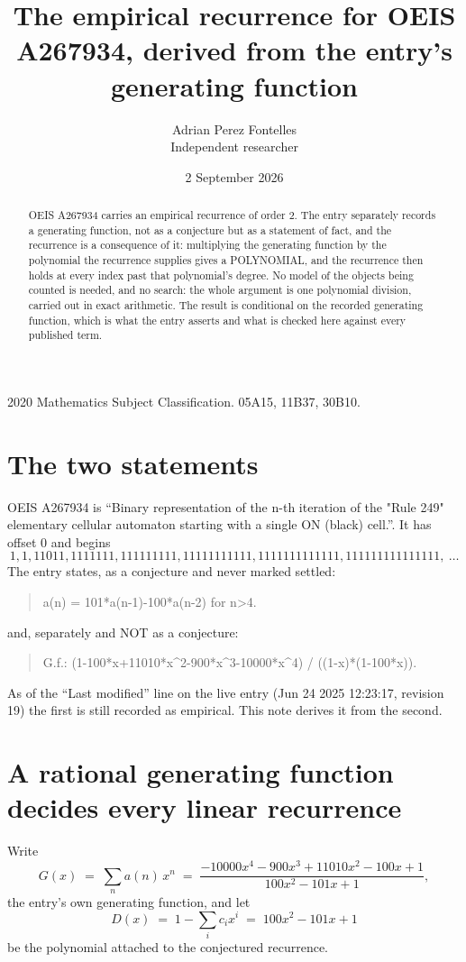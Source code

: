 \documentclass[11pt,a4paper]{article}
\title{The empirical recurrence for OEIS A267934, derived from the entry's generating function}
\author{Adrian Perez Fontelles\\ \small Independent researcher}
\date{2 September 2026}
\theoremstyle{plain}
\theoremstyle{definition}
\begin{document}
\maketitle

\begin{abstract}
OEIS A267934 carries an empirical recurrence of order $2$. The entry separately records a
generating function, not as a conjecture but as a statement of fact, and the recurrence is a
consequence of it: multiplying the generating function by the polynomial the recurrence
supplies gives a POLYNOMIAL, and the recurrence then holds at every index past that
polynomial's degree. No model of the objects being counted is needed, and no search: the
whole argument is one polynomial division, carried out in exact arithmetic. The result is
conditional on the recorded generating function, which is what the entry asserts and what is
checked here against every published term.
\end{abstract}

\noindent\small 2020 Mathematics Subject Classification. 05A15, 11B37, 30B10.\normalsize

\section{The two statements}

OEIS A267934 is ``Binary representation of the n-th iteration of the "Rule 249" elementary cellular automaton starting with a single ON (black) cell.''. It has offset $0$ and begins
\[
1, 1, 11011, 1111111, 111111111, 11111111111, 1111111111111, 111111111111111,\ \dots
\]
The entry states, as a conjecture and never marked settled:
\begin{quote}
a(n) = 101*a(n-1)-100*a(n-2) for n>4.
\end{quote}
and, separately and NOT as a conjecture:
\begin{quote}
G.f.: (1-100*x+11010*x\^{}2-900*x\^{}3-10000*x\^{}4) / ((1-x)*(1-100*x)).
\end{quote}
As of the ``Last modified'' line on the live entry (Jun 24 2025 12:23:17, revision 19) the first is still
recorded as empirical. This note derives it from the second.

\section{A rational generating function decides every linear recurrence}

Write
\[
G(x)\;=\;\sum_{n}a(n)\,x^{n}\;=\;\frac{- 10000 x^{4} - 900 x^{3} + 11010 x^{2} - 100 x + 1}{100 x^{2} - 101 x + 1},
\]
the entry's own generating function, and let
\[
D(x)\;=\;1-\sum_i c_i x^{i}\;=\;100 x^{2} - 101 x + 1
\]
be the polynomial attached to the conjectured recurrence.
\end{document}
